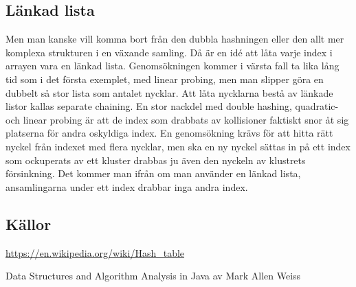 \documentclass[a5paper,10pt,oneside]{article}
\begin{document}
\subsection*{Länkad lista}
Men man kanske vill komma bort från den dubbla hashningen eller den allt mer komplexa strukturen i en växande samling. Då är en idé att låta varje index i arrayen vara en länkad lista. Genomsökningen kommer i värsta fall ta lika lång tid som i det första exemplet, med linear probing, men man slipper göra en dubbelt så stor lista som antalet nycklar. Att låta nycklarna bestå av länkade listor kallas separate chaining. En stor nackdel med double hashing, quadratic- och linear probing är att de index som drabbats av kollisioner faktiskt snor åt sig platserna för andra oskyldiga index. En genomsökning krävs för att hitta rätt nyckel från indexet med flera nycklar, men ska en ny nyckel sättas in på ett index som ockuperats av ett kluster drabbas ju även den nyckeln av klustrets försinkning. Det kommer man ifrån om man använder en länkad lista, ansamlingarna under ett index drabbar inga andra index. 


\subsection*{Källor}
 \url{https://en.wikipedia.org/wiki/Hash_table} 
 
Data Structures and Algorithm Analysis in Java av Mark Allen Weiss
\end{document}
